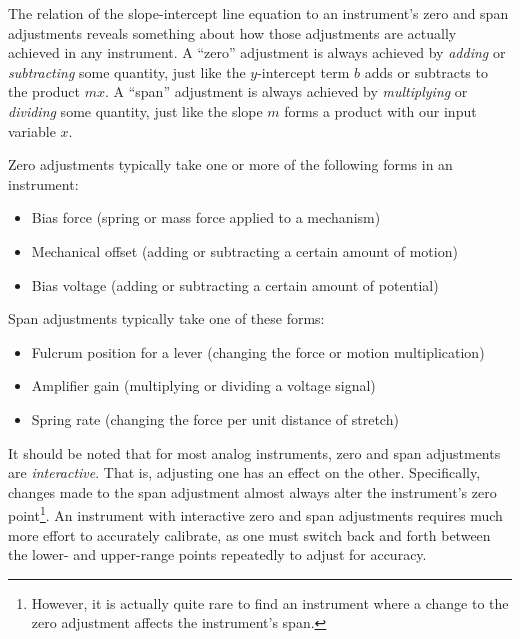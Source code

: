 The relation of the slope-intercept line equation to an instrument's zero and span adjustments reveals something about how those adjustments are actually achieved in any instrument.  A ``zero'' adjustment is always achieved by \textit{adding} or \textit{subtracting} some quantity, just like the $y$-intercept term $b$ adds or subtracts to the product $mx$.  A ``span'' adjustment is always achieved by \textit{multiplying} or \textit{dividing} some quantity, just like the slope $m$ forms a product with our input variable $x$.  

\vskip 10pt

\filbreak

\noindent
Zero adjustments typically take one or more of the following forms in an instrument:

\begin{itemize}
\item Bias force (spring or mass force applied to a mechanism)
\item Mechanical offset (adding or subtracting a certain amount of motion)
\item Bias voltage (adding or subtracting a certain amount of potential)
\end{itemize}

\filbreak

\noindent
Span adjustments typically take one of these forms:

\begin{itemize}
\item Fulcrum position for a lever (changing the force or motion multiplication)
\item Amplifier gain (multiplying or dividing a voltage signal)
\item Spring rate (changing the force per unit distance of stretch)
\end{itemize}

It should be noted that for most analog instruments, zero and span adjustments are \textit{interactive}.  That is, adjusting one has an effect on the other.  Specifically, changes made to the span adjustment almost always alter the instrument's zero point\footnote{However, it is actually quite rare to find an instrument where a change to the zero adjustment affects the instrument's span.}.  An instrument with interactive zero and span adjustments requires much more effort to accurately calibrate, as one must switch back and forth between the lower- and upper-range points repeatedly to adjust for accuracy. 
 






